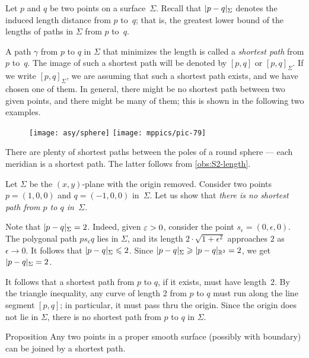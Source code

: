 Let $p$ and $q$ be two points on a surface~$\Sigma$.
Recall that $\dist{p}{q}\Sigma$ denotes the induced length distance from $p$ to~$q$;
that is, the greatest lower bound of the lengths of paths in $\Sigma$ from $p$ to~$q$.


A path $\gamma$ from $p$ to $q$ in $\Sigma$ that minimizes the length is called a \emph{shortest path} from $p$ to~$q$.
The image of such a shortest path will be denoted by $[p,q]$ or $[p,q]_\Sigma$.
If we write $[p,q]_\Sigma$, we are assuming that such a shortest path exists, and we have chosen one of them.
In general, there might be no shortest path between two given points, and there might be many of them;
this is shown in the following two examples.


{

\begin{wrapfigure}[9]{r}{28 mm}
\vskip-6mm
\centering
\texttt{[image: asy/sphere]}
\bigskip
\texttt{[image: mppics/pic-79]}
\end{wrapfigure}

 There are plenty of shortest paths between the poles of a round sphere --- each meridian is a shortest path.
The latter follows from \ref{obs:S2-length}.

 Let $\Sigma$ be the $(x,y)$-plane with the origin removed.
Consider two points $p=(1,0,0)$ and $q=(-1,0,0)$ in~$\Sigma$.
Let us show that \textit{there is no shortest path from $p$ to $q$ in~$\Sigma$.}

Note that $\dist{p}{q}\Sigma=2$. 
Indeed, given $\epsilon\z>0$, consider the point $s_\epsilon=(0,\epsilon,0)$.
The polygonal path $ps_\epsilon q$ lies in $\Sigma$, and its length $2\cdot\sqrt{1+\epsilon^2}$ approaches $2$ as $\epsilon\to0$.
It follows that $\dist{p}{q}\Sigma\le 2$.
Since $\dist{p}{q}\Sigma\z\ge \dist{p}{q}{\mathbb{R}^3}=2$, we get $\dist{p}{q}\Sigma=2$.

It follows that a shortest path from $p$ to $q$, if it exists, must have length~2.
By the triangle inequality, any curve of length 2 from $p$ to $q$ must run along the line segment $[p,q]$;
in particular, it must pass thru the origin.
Since the origin does not lie in $\Sigma$, there is no shortest path from $p$ to $q$ in $\Sigma$. 


\begin{thm}{Proposition}\label{prop:shortest-paths-exist}
Any two points in a proper smooth surface (possibly with boundary) can be joined by a shortest path. 
\end{thm}

}
